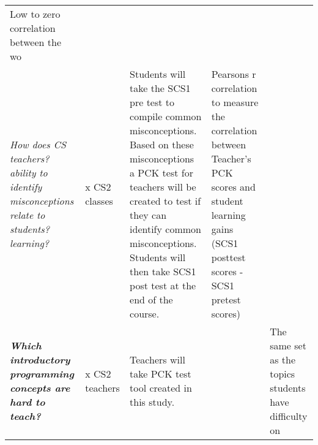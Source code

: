\begin{landscape}
\begin{longtable}[]{@{}p{100pt} p{40pt}p{160pt} p{160pt} p{40pt} @{}}
\begin{minipage}[t]{0.07\columnwidth}
	Low to zero correlation between the wo\strut
	\end{minipage}\tabularnewline
	\begin{minipage}[t]{0.19\columnwidth}\raggedright\strut
	\emph{How does CS teachers? ability to identify misconceptions relate to
	students? learning?}\strut
	\end{minipage} & \begin{minipage}[t]{0.19\columnwidth}\raggedright\strut
	x CS2 classes\strut
	\end{minipage} & \begin{minipage}[t]{0.19\columnwidth}\raggedright\strut
	Students will take the SCS1 pre test to compile common misconceptions.
	Based on these misconceptions a PCK test for teachers will be created to
	test if they can identify common misconceptions. Students will then take
	SCS1 post test at the end of the course.\strut
	\end{minipage} & \begin{minipage}[t]{0.19\columnwidth}\raggedright\strut
	Pearsons r correlation to measure the correlation between Teacher's PCK
	scores and student learning gains (SCS1 posttest scores - SCS1 pretest
	scores)\strut
	\end{minipage} & \begin{minipage}[t]{0.19\columnwidth}\raggedright\strut
	\strut
	\end{minipage}\tabularnewline
	\begin{minipage}[t]{0.19\columnwidth}\raggedright\strut
	\textbf{\emph{Which introductory programming concepts are hard to
	teach?}}\strut
	\end{minipage} & \begin{minipage}[t]{0.19\columnwidth}\raggedright\strut
	x CS2 teachers\strut
	\end{minipage} & \begin{minipage}[t]{0.19\columnwidth}\raggedright\strut
	Teachers will take PCK test tool created in this study.\strut
	\end{minipage} & \begin{minipage}[t]{0.19\columnwidth}\raggedright\strut
	\strut
	\end{minipage} & \begin{minipage}[t]{0.19\columnwidth}\raggedright\strut
	The same set as the topics students have difficulty on\strut
	\end{minipage}\tabularnewline
	\bottomrule
	\end{longtable}
\end{landscape}





